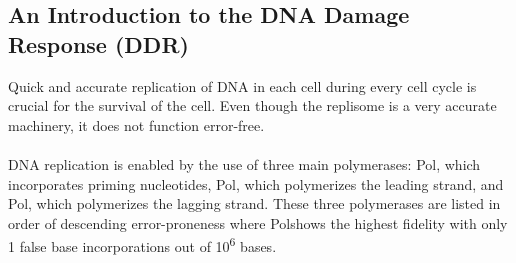 \subsection{An Introduction to the DNA Damage Response (DDR)}
Quick and accurate replication of DNA in each cell during every cell cycle is crucial for the survival of the cell. Even though the replisome is a very accurate machinery, it does not function error-free.\\\\
DNA replication is enabled by the use of three main polymerases: Pol\textalpha, which incorporates priming nucleotides, Pol\textdelta, which polymerizes the leading strand, and Pol\textepsilon, which polymerizes the lagging strand. These three polymerases are listed in order of descending error-proneness where Pol\textepsilon shows the highest fidelity with only 1 false base incorporations out of 10\textsuperscript{6} bases. 

